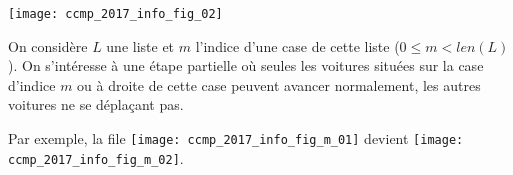 \hfill
\hfill {}

\begin{center}
	\texttt{[image: ccmp\_2017\_info\_fig\_02]}
\end{center}



On considère $L$ une liste et $m$ l'indice d'une case de cette liste ($0 \leqslant m < len(L)$). On
s'intéresse à une étape partielle où seules les voitures situées sur la case d'indice $m$ ou à droite de
cette case peuvent avancer normalement, les autres voitures ne se déplaçant pas.


Par exemple, la file  \texttt{[image: ccmp\_2017\_info\_fig\_m\_01]}
 devient \texttt{[image: ccmp\_2017\_info\_fig\_m\_02]}.

